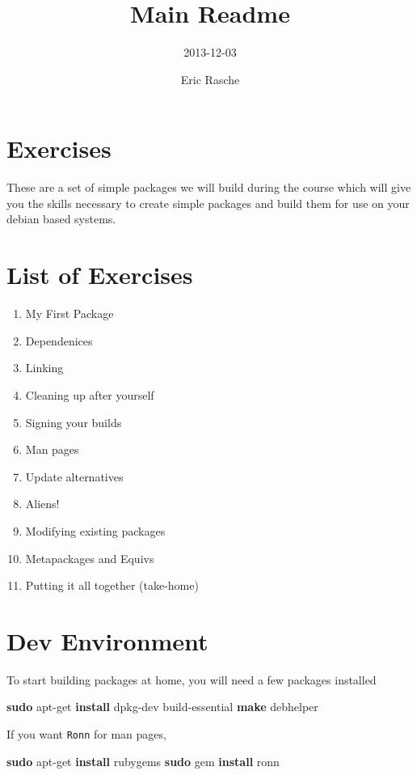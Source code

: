 \documentclass[]{article}
\title{Main Readme}
\author{2013-12-03}
\date{Eric Rasche}
\newenvironment{Shaded}{}{}
\newcommand{\KeywordTok}[1]{\textcolor[rgb]{0.00,0.44,0.13}{\textbf{{#1}}}}
\newcommand{\NormalTok}[1]{{#1}}
\begin{document}
\maketitle

\section{Exercises}

These are a set of simple packages we will build during the course which
will give you the skills necessary to create simple packages and build
them for use on your debian based systems.

\section{List of Exercises}

\begin{enumerate}[1.]
\item
  My First Package
\item
  Dependenices
\item
  Linking
\item
  Cleaning up after yourself
\item
  Signing your builds
\item
  Man pages
\item
  Update alternatives
\item
  Aliens!
\item
  Modifying existing packages
\item
  Metapackages and Equivs
\item
  Putting it all together (take-home)
\end{enumerate}
\section{Dev Environment}

To start building packages at home, you will need a few packages
installed

\begin{Shaded}
\begin{Highlighting}[]
\KeywordTok{sudo} \NormalTok{apt-get }\KeywordTok{install} \NormalTok{dpkg-dev build-essential }\KeywordTok{make} \NormalTok{debhelper}
\end{Highlighting}
\end{Shaded}
If you want \texttt{Ronn} for man pages,

\begin{Shaded}
\begin{Highlighting}[]
\KeywordTok{sudo} \NormalTok{apt-get }\KeywordTok{install} \NormalTok{rubygems}
\KeywordTok{sudo} \NormalTok{gem }\KeywordTok{install} \NormalTok{ronn}
\end{Highlighting}
\end{Shaded}
\end{document}
